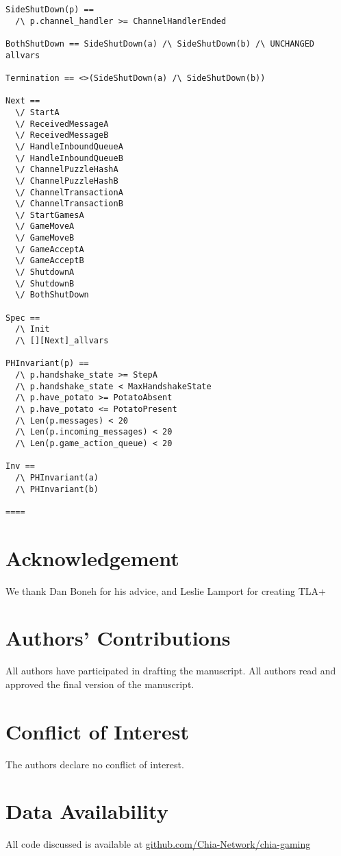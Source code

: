 \documentclass[a4paper]{article}
\begin{document}
\begin{multicols}{2}
\begin{verbatim}
SideShutDown(p) ==
  /\ p.channel_handler >= ChannelHandlerEnded

BothShutDown == SideShutDown(a) /\ SideShutDown(b) /\ UNCHANGED allvars

Termination == <>(SideShutDown(a) /\ SideShutDown(b))

Next ==
  \/ StartA
  \/ ReceivedMessageA
  \/ ReceivedMessageB
  \/ HandleInboundQueueA
  \/ HandleInboundQueueB
  \/ ChannelPuzzleHashA
  \/ ChannelPuzzleHashB
  \/ ChannelTransactionA
  \/ ChannelTransactionB
  \/ StartGamesA
  \/ GameMoveA
  \/ GameMoveB
  \/ GameAcceptA
  \/ GameAcceptB
  \/ ShutdownA
  \/ ShutdownB
  \/ BothShutDown

Spec ==
  /\ Init
  /\ [][Next]_allvars

PHInvariant(p) ==
  /\ p.handshake_state >= StepA
  /\ p.handshake_state < MaxHandshakeState
  /\ p.have_potato >= PotatoAbsent
  /\ p.have_potato <= PotatoPresent
  /\ Len(p.messages) < 20
  /\ Len(p.incoming_messages) < 20
  /\ Len(p.game_action_queue) < 20

Inv ==
  /\ PHInvariant(a)
  /\ PHInvariant(b)

====

\end{verbatim}

\twocolumn
\section*{Acknowledgement}
We thank Dan Boneh for his advice, and Leslie Lamport for creating TLA+

\section*{Authors' Contributions}
All authors have participated in drafting the manuscript. All authors read and approved the final version of the manuscript.

\section*{Conflict of Interest}
The authors declare no conflict of interest.

\section*{Data Availability}
All code discussed is available at \href{https://github.com/Chia-Network/chia-gaming}{github.com/Chia-Network/chia-gaming}


\end{multicols}
\end{document}

